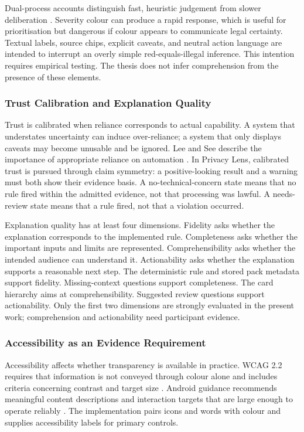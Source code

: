Dual-process accounts distinguish fast, heuristic judgement from slower deliberation \cite{22}. Severity colour can produce a rapid response, which is useful for prioritisation but dangerous if colour appears to communicate legal certainty. Textual labels, source chips, explicit caveats, and neutral action language are intended to interrupt an overly simple red-equals-illegal inference. This intention requires empirical testing. The thesis does not infer comprehension from the presence of these elements.

\subsubsection{Trust Calibration and Explanation Quality}

Trust is calibrated when reliance corresponds to actual capability. A system that understates uncertainty can induce over-reliance; a system that only displays caveats may become unusable and be ignored. Lee and See describe the importance of appropriate reliance on automation \cite{34}. In Privacy Lens, calibrated trust is pursued through claim symmetry: a positive-looking result and a warning must both show their evidence basis. A no-technical-concern state means that no rule fired within the admitted evidence, not that processing was lawful. A needs-review state means that a rule fired, not that a violation occurred.

Explanation quality has at least four dimensions. Fidelity asks whether the explanation corresponds to the implemented rule. Completeness asks whether the important inputs and limits are represented. Comprehensibility asks whether the intended audience can understand it. Actionability asks whether the explanation supports a reasonable next step. The deterministic rule and stored pack metadata support fidelity. Missing-context questions support completeness. The card hierarchy aims at comprehensibility. Suggested review questions support actionability. Only the first two dimensions are strongly evaluated in the present work; comprehension and actionability need participant evidence.

\subsubsection{Accessibility as an Evidence Requirement}

Accessibility affects whether transparency is available in practice. WCAG 2.2 requires that information is not conveyed through colour alone and includes criteria concerning contrast and target size \cite{wcag22}. Android guidance recommends meaningful content descriptions and interaction targets that are large enough to operate reliably \cite{androidaccess}. The implementation pairs icons and words with colour and supplies accessibility labels for primary controls.

